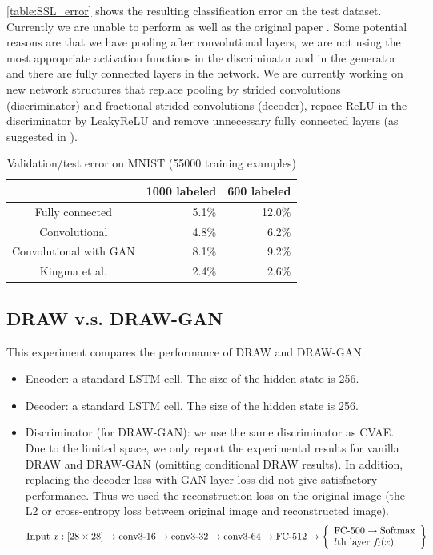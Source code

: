 \documentclass[10pt]{article}
\begin{document}
  \autoref{table:SSL_error} shows the resulting classification error on the test dataset. Currently we are unable to perform as well as the original paper \cite{DBLP:journals/corr/KingmaRMW14}. Some potential reasons are that we have pooling after convolutional layers, we are not using the most appropriate activation functions in the discriminator and in the generator and there are fully connected layers in the network. We are currently working on new network structures that replace pooling by strided convolutions (discriminator) and fractional-strided convolutions (decoder), repace ReLU in the discriminator by LeakyReLU and remove unnecessary fully connected layers (as suggested in \cite{alec2016dcgan}).

\begin{table}[!ht]
\centering
\begin{tabular}{c|r|r}
& 1000 labeled & 600 labeled\\ \hline
Fully connected &  5.1\% &  12.0\%\\
Convolutional &  4.8\% &  6.2\%\\
Convolutional with GAN &  8.1\% &  9.2\%\\
Kingma et al. \cite{DBLP:journals/corr/KingmaRMW14}
& 2.4\% & 2.6\%
\end{tabular}
\caption{Validation/test error on MNIST (55000 training examples)}
\label{table:SSL_error}
\end{table}




\subsection{DRAW v.s. DRAW-GAN}
This experiment compares the performance of DRAW and DRAW-GAN.



\begin{itemize}

\item Encoder: a standard LSTM cell. The size of the hidden state is 256.

\item Decoder: a standard LSTM cell. The size of the hidden state is 256.


\item Discriminator (for DRAW-GAN): we use the same discriminator as CVAE. Due to the limited space, we only report the experimental results for vanilla DRAW and DRAW-GAN (omitting conditional DRAW results). In addition, replacing the decoder loss with GAN layer loss did not give satisfactory performance. Thus we used the reconstruction loss on the original image (the L2 or cross-entropy loss between original image and reconstructed image).
\[
\text{Input } x: [28\times 28] \to \text{conv3-16} \to \text{conv3-32} \to \text{conv3-64} \\
\to \text{FC-512} \to \left\{\begin{array}{lr}
        \text{FC-500}\to \text{Softmax}\\
        \text{$l$th layer $f_l(x)$}
        \end{array}\right\}
\]
\end{itemize}
\end{document}

